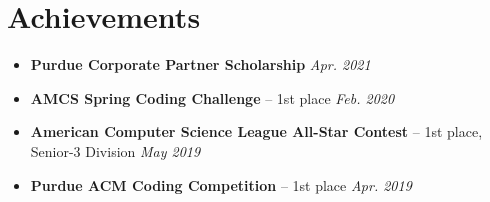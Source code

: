 \documentclass[11pt,letterpaper]{article}
\newcommand{\resumeItemListStart}{
    \begin{itemize}[itemsep=1pt, parsep=0pt, topsep=0pt]
}
\newcommand{\resumeItemListEnd}{
    \end{itemize}
}
\begin{document}
\section{Achievements}

\resumeItemListStart
    \item \textbf{Purdue Corporate Partner Scholarship} \hfill \textit{Apr. 2021}
	\item \textbf{AMCS Spring Coding Challenge} -- 1st place \hfill \textit{Feb. 2020}
	\item \textbf{American Computer Science League All-Star Contest} -- 1st place, Senior-3 Division \hfill \textit{May 2019}
	\item \textbf{Purdue ACM Coding Competition} -- 1st place \hfill \textit{Apr. 2019}
\resumeItemListEnd
	
\end{document}
